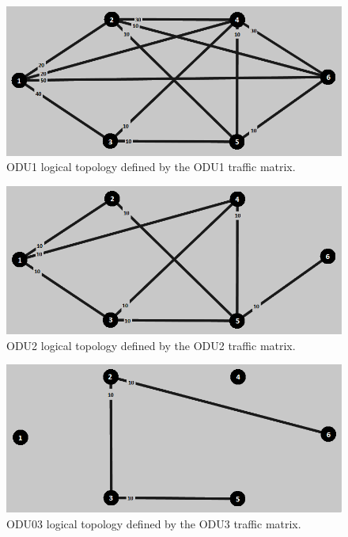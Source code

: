 \begin{figure}[H]
\centering
\includegraphics[width=13cm]{sdf/heuristic/opaque_protection/medium/logical_topology_odu1_medium}
\caption{ODU1 logical topology defined by the ODU1 traffic matrix.}
\label{logical_ODU1_protec_ref_medium_heuristic}
\end{figure}

\begin{figure}[H]
\centering
\includegraphics[width=13cm]{sdf/heuristic/opaque_protection/medium/logical_topology_odu2_medium}
\caption{ODU2 logical topology defined by the ODU2 traffic matrix.}
\label{logical_ODU2_protec_ref_medium_heuristic}
\end{figure}

\begin{figure}[H]
\centering
\includegraphics[width=13cm]{sdf/heuristic/opaque_protection/medium/logical_topology_odu3_medium}
\caption{ODU03 logical topology defined by the ODU3 traffic matrix.}
\label{logical_ODU3_protec_ref_medium_heuristic}
\end{figure}


